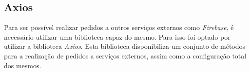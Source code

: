 \subsection{Axios}

Para ser possível realizar pedidos a outros serviços externos como \textit{Firebase}, é necessário utilizar uma biblioteca capaz do mesmo. Para isso foi optado por utilizar a biblioteca \textit{Axios}. Esta biblioteca disponibiliza um conjunto de métodos para a realização de pedidos a serviços externos, assim como a configuração total dos mesmos.